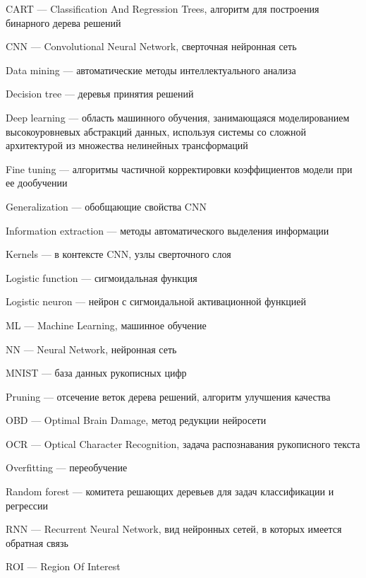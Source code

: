 \documentclass[a4paper,14pt]{extarticle} %
\begin{document}
\noindent CART --- Classification And Regression Trees, алгоритм  для построения бинарного дерева решений

\noindent CNN --- Convolutional Neural Network, сверточная нейронная сеть

\noindent Data mining --- автоматические методы интеллектуального анализа

\noindent Decision tree --- деревья принятия решений

\noindent Deep learning --- область машинного обучения, занимающаяся моделированием высокоуровневых абстракций данных, используя системы со сложной архитектурой из множества нелинейных трансформаций

\noindent Fine tuning --- алгоритмы частичной корректировки коэффициентов модели при ее дообучении

\noindent Generalization --- обобщающие свойства CNN

\noindent Information extraction --- методы автоматического выделения информации

\noindent Kernels --- в контексте CNN, узлы сверточного слоя

\noindent Logistic function --- сигмоидальная функция 

\noindent Logistic neuron --- нейрон с сигмоидальной активационной функцией

\noindent ML --- Machine Learning, машинное обучение

\noindent NN --- Neural Network, нейронная сеть

\noindent MNIST --- база данных рукописных цифр

\noindent Pruning --- отсечение веток дерева решений, алгоритм улучшения качества

\noindent OBD --- Optimal Brain Damage, метод редукции нейросети

\noindent OCR --- Optical Character Recognition, задача распознавания рукописного текста

\noindent Overfitting --- переобучение 

\noindent Random forest --- комитета решающих деревьев для задач классификации и регрессии

\noindent RNN --- Recurrent Neural Network, вид нейронных сетей, в которых имеется обратная связь

\noindent ROI --- Region Of Interest 

\newpage
\begin{flushleft}
\end{flushleft}
\end{document}
